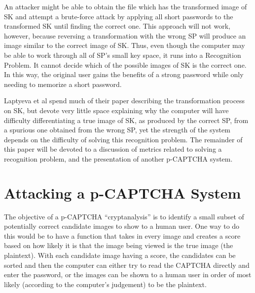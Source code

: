 \documentclass[12pt]{article}
\begin{document}
	An attacker might be able to obtain the file which has the transformed image of SK and attempt a brute-force attack by applying all short passwords to the transformed SK until finding the correct one. This approach will not work, however, because reversing a transformation with the wrong SP will produce an image similar to the correct image of SK. Thus, even though the computer may be able to work through all of SP's small key space, it runs into a Recognition Problem. It cannot decide which of the possible images of SK is the correct one. In this way, the original user gains the benefits of a strong password while only needing to memorize a short password.

	Laptyeva et al spend much of their paper describing the transformation process on SK, but devote very little space explaining why the computer will have difficulty differentiating a true image of SK, as produced by the correct SP, from a spurious one obtained from the wrong SP, yet the strength of the system depends on the difficulty of solving this recognition problem. The remainder of this paper will be devoted to a discussion of metrics related to solving a recognition problem, and the presentation of another p-CAPTCHA system.

\section*{Attacking a p-CAPTCHA System}
	The objective of a p-CAPTCHA “cryptanalysis” is to identify a small subset of potentially correct candidate images to show to a human user. One way to do this would be to have a function that takes in every image and creates a score based on how likely it is that the image being viewed is the true image (the plaintext). With each candidate image having a score, the candidates can be sorted and then the computer can either try to read the CAPTCHA directly and enter the password, or the images can be shown to a human user in order of most likely (according to the computer's judgement) to be the plaintext.
\end{document}
